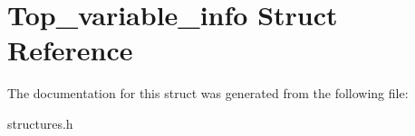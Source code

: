 \hypertarget{structTop__variable__info}{}\section{Top\+\_\+variable\+\_\+info Struct Reference}
\label{structTop__variable__info}


The documentation for this struct was generated from the following file\+:\begin{DoxyCompactItemize}
\item 
structures.\+h\end{DoxyCompactItemize}
